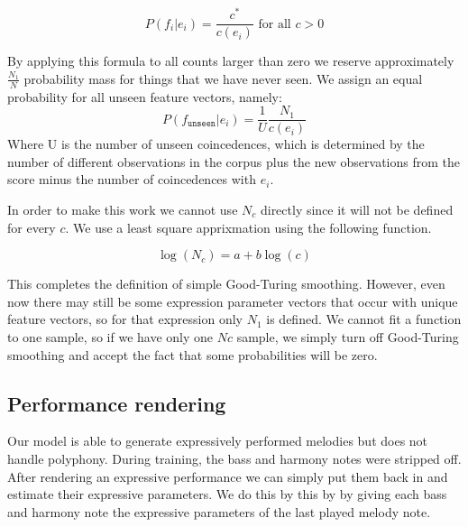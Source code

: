 \documentclass[a4paper,10pt]{article}
\begin{document}
\[P(f_i|e_i) = \frac{c^*}{c(e_i)} \mbox{ for all } c > 0 \]

By applying this formula to all counts larger than zero we reserve approximately $\frac{N_1}{N}$ probability mass for things that we have never seen. We assign an equal probability for all unseen feature vectors, namely:
\[
P(f_{\texttt{unseen}}|e_i) = \frac{1}{U} \frac{N_1}{c(e_i)} 
\]
Where U is the number of unseen coincedences, which is determined by the number of different observations in the corpus plus the new observations from the score minus the number of coincedences with $e_i$.

In order to make this work we cannot use $N_c$ directly since it will not be defined for every $c$. We use a least square apprixmation using the following function. 

\[\log(N_c) = a + b \log(c)\]

This completes the definition of simple Good-Turing smoothing. However, even now there may still be some expression parameter vectors that occur with unique feature vectors, so for that expression only $N_1$ is defined. We cannot fit a function to one sample, so if we have only one $Nc$ sample, we simply turn off Good-Turing smoothing and accept the fact that some probabilities will be zero. 

\subsection{Performance rendering}

Our model is able to generate expressively performed melodies but does not handle polyphony. During training, the bass and harmony notes were stripped off. After rendering an expressive performance we can simply put them back in and estimate their expressive parameters. We do this by this by by giving each  bass and harmony note the expressive parameters of the last played melody note. 

\end{document}
